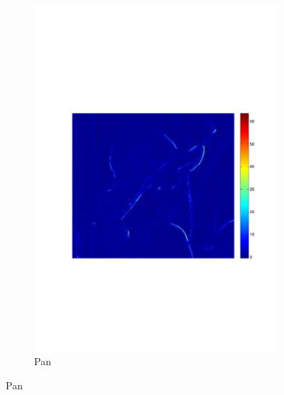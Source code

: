 \documentclass[twocolumn]{el-author}
\begin{document}
\begin{figure}[t]
\begin{subfigure}[b]{0.32\linewidth}
    \includegraphics[width=\linewidth]{5Pan2}
    \caption{Pan~\cite{Pan_MPE_2014}}
    \label{fig:minimax_path:path}
\end{subfigure}


\end{figure}
\end{document}
